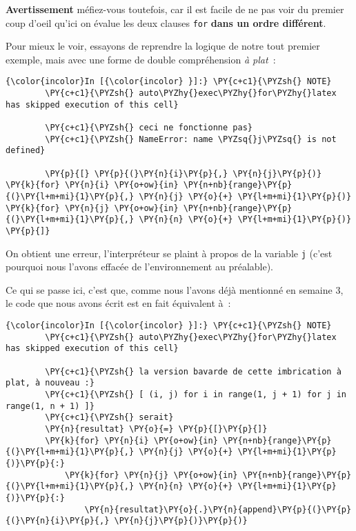     \textbf{Avertissement} méfiez-vous toutefois, car il est facile de ne
pas voir du premier coup d'oeil qu'ici on évalue les deux clauses
\texttt{for} \textbf{dans un ordre différent}.

    Pour mieux le voir, essayons de reprendre la logique de notre tout
premier exemple, mais avec une forme de double compréhension \emph{à
plat}~:

    \begin{Verbatim}[commandchars=\\\{\}]
{\color{incolor}In [{\color{incolor} }]:} \PY{c+c1}{\PYZsh{} NOTE}
        \PY{c+c1}{\PYZsh{} auto\PYZhy{}exec\PYZhy{}for\PYZhy{}latex has skipped execution of this cell}
        
        \PY{c+c1}{\PYZsh{} ceci ne fonctionne pas}
        \PY{c+c1}{\PYZsh{} NameError: name \PYZsq{}j\PYZsq{} is not defined}
        
        \PY{p}{[} \PY{p}{(}\PY{n}{i}\PY{p}{,} \PY{n}{j}\PY{p}{)} \PY{k}{for} \PY{n}{i} \PY{o+ow}{in} \PY{n+nb}{range}\PY{p}{(}\PY{l+m+mi}{1}\PY{p}{,} \PY{n}{j} \PY{o}{+} \PY{l+m+mi}{1}\PY{p}{)} \PY{k}{for} \PY{n}{j} \PY{o+ow}{in} \PY{n+nb}{range}\PY{p}{(}\PY{l+m+mi}{1}\PY{p}{,} \PY{n}{n} \PY{o}{+} \PY{l+m+mi}{1}\PY{p}{)} \PY{p}{]}
\end{Verbatim}


    On obtient une erreur, l'interpréteur se plaint à propos de la variable
\texttt{j} (c'est pourquoi nous l'avons effacée de l'environnement au
préalable).

    Ce qui se passe ici, c'est que, comme nous l'avons déjà mentionné en
semaine 3, le code que nous avons écrit est en fait équivalent à~:

    \begin{Verbatim}[commandchars=\\\{\}]
{\color{incolor}In [{\color{incolor} }]:} \PY{c+c1}{\PYZsh{} NOTE}
        \PY{c+c1}{\PYZsh{} auto\PYZhy{}exec\PYZhy{}for\PYZhy{}latex has skipped execution of this cell}
        
        \PY{c+c1}{\PYZsh{} la version bavarde de cette imbrication à plat, à nouveau :}
        \PY{c+c1}{\PYZsh{} [ (i, j) for i in range(1, j + 1) for j in range(1, n + 1) ]}
        \PY{c+c1}{\PYZsh{} serait}
        \PY{n}{resultat} \PY{o}{=} \PY{p}{[}\PY{p}{]}
        \PY{k}{for} \PY{n}{i} \PY{o+ow}{in} \PY{n+nb}{range}\PY{p}{(}\PY{l+m+mi}{1}\PY{p}{,} \PY{n}{j} \PY{o}{+} \PY{l+m+mi}{1}\PY{p}{)}\PY{p}{:}
            \PY{k}{for} \PY{n}{j} \PY{o+ow}{in} \PY{n+nb}{range}\PY{p}{(}\PY{l+m+mi}{1}\PY{p}{,} \PY{n}{n} \PY{o}{+} \PY{l+m+mi}{1}\PY{p}{)}\PY{p}{:}
                \PY{n}{resultat}\PY{o}{.}\PY{n}{append}\PY{p}{(}\PY{p}{(}\PY{n}{i}\PY{p}{,} \PY{n}{j}\PY{p}{)}\PY{p}{)}
\end{Verbatim}


